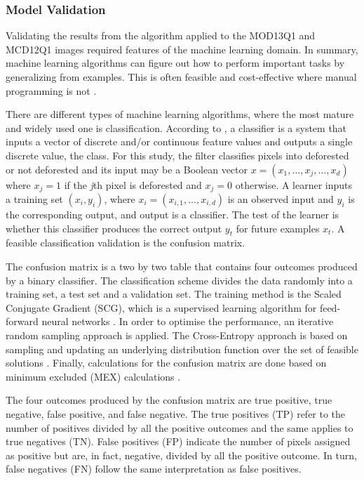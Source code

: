 \subsubsection{Model Validation}  %

Validating the results from the algorithm applied to the MOD13Q1 and MCD12Q1 images required features of the machine learning domain. In summary, machine learning algorithms can figure out how to perform important tasks by generalizing from examples. This is often feasible and cost-effective where manual programming is not \citep{Domingos_2012}.

There are different types of machine learning algorithms, where the most mature and widely used one is classification. According to \citet{Domingos_2012}, a classifier is a system that inputs a vector of discrete and/or continuous feature values and outputs a single discrete value, the class. For this study, the filter classifies pixels into deforested or not deforested and its input may be a Boolean vector $x = (x_{1},\dots, x_{j},\dots, x_{d})$ where $x_{j} = 1$ if the \textit{j}th pixel is deforested and $x_{j} = 0$ otherwise. A learner inputs a training set $(x_{i}, y_{i})$, where $x_{i} = (x_{i,1},\dots, x_{i,d})$ is an observed input and $y_{i}$ is the corresponding output, and output is a classifier. The test of the learner is whether this classifier produces the correct output $y_{t}$ for future examples $x_{t}$. A feasible classification validation is the confusion matrix. 


The confusion matrix is a two by two table that contains four outcomes produced by a binary classifier. The classification scheme divides the data randomly into a training set, a test set and a validation set. The training method is the Scaled Conjugate Gradient (SCG), which is a supervised learning algorithm for feed-forward neural networks \citep{mor_1993}. In order to optimise the performance, an iterative random sampling approach is applied. The Cross-Entropy approach is based on sampling and updating an underlying distribution function over the set of feasible solutions \citep{HU_2009}. Finally, calculations for the confusion matrix are done based on minimum excluded (MEX) calculations \citep{matlab_2017}.

The four outcomes produced by the confusion matrix are true positive, true negative, false positive, and false negative. The true positives (TP) refer to the number of positives divided by all the positive outcomes and the same applies to true negatives (TN). False positives (FP) indicate the number of pixels assigned as positive but are, in fact, negative, divided by all the positive outcome. In turn, false negatives (FN) follow the same interpretation as false positives. 


